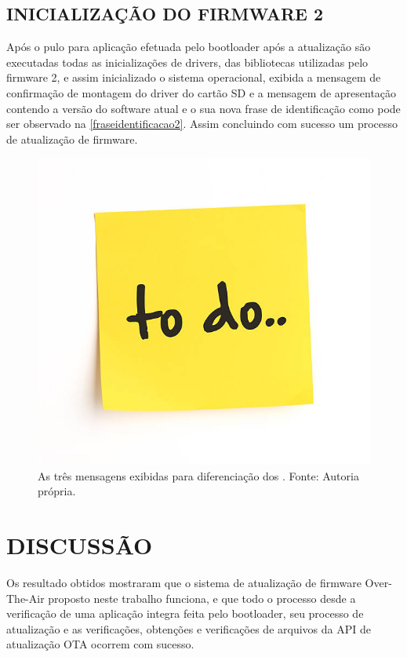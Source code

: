 \subsection{INICIALIZAÇÃO DO FIRMWARE 2}
Após o pulo para aplicação efetuada pelo bootloader após a atualização são executadas todas as inicializações de drivers, das bibliotecas utilizadas pelo firmware 2, e assim inicializado o sistema operacional, exibida a mensagem de confirmação de montagem do driver do cartão SD e a mensagem de apresentação contendo a versão do software atual e o sua nova frase de identificação como pode ser observado na \autoref{fraseidentificacao2}. Assim concluindo com sucesso um processo de atualização de firmware.

\begin{figure}[H]
    \scriptsize
     \centering
     \includegraphics[scale=1.2]{dados/figuras/ToDo.jpg}
     \caption{As três mensagens exibidas para diferenciação dos \firmware. \newline Fonte: Autoria própria.}
     \label{fraseidentificacao2}
\end{figure}



\section{DISCUSSÃO}
Os resultado obtidos mostraram que o sistema de atualização de firmware Over-The-Air proposto neste trabalho funciona, e que todo o processo desde a verificação de uma aplicação integra feita pelo bootloader, seu processo de atualização e as verificações, obtenções e verificações de arquivos da API de atualização OTA ocorrem com sucesso.

